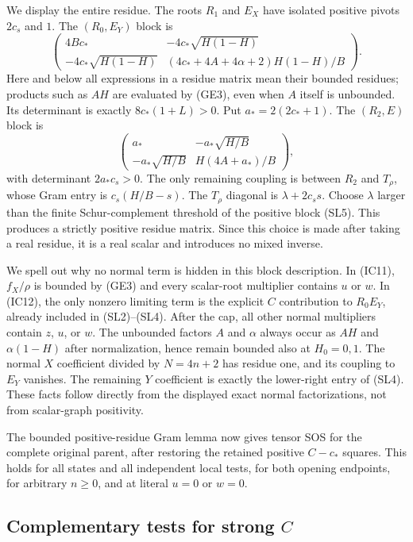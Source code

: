 We display the entire residue. The roots $R_1$ and $E_X$ have isolated
positive pivots $2c_s$ and $1$. The $(R_0,E_Y)$ block is
\[
 \begin{pmatrix}
 4Bc_*&-4c_*\sqrt{H(1-H)}\\
 -4c_*\sqrt{H(1-H)}&
 (4c_*+4A+4\alpha+2)H(1-H)/B
 \end{pmatrix}.
\tag{SL4}
\]
Here and below all expressions in a residue matrix mean their bounded
residues; products such as $AH$ are evaluated by (GE3), even when
$A$ itself is unbounded. Its determinant is exactly $8c_*(1+L)>0$.
Put $a_*=2(2c_*+1)$. The $(R_2,E)$ block is
\[
 \begin{pmatrix}
 a_*&-a_*\sqrt{H/B}\\
 -a_*\sqrt{H/B}&H(4A+a_*)/B
 \end{pmatrix},
\tag{SL5}
\]
with determinant $2a_*c_s>0$. The only remaining coupling is between
$R_2$ and $T_\rho$, whose Gram entry is
$c_s(H/B-s)$. The $T_\rho$ diagonal is $\lambda+2c_s s$.
Choose $\lambda$ larger than the finite Schur-complement threshold
of the positive block (SL5). This produces a strictly positive
residue matrix. Since this choice is made after taking a real
residue, it is a real scalar and introduces no mixed inverse.

We spell out why no normal term is hidden in this block description.
In (IC11), $f_X/\rho$ is bounded by (GE3) and every scalar-root
multiplier contains $u$ or $w$. In (IC12), the only nonzero limiting
term is the explicit $C$ contribution to $R_0E_Y$, already included
in (SL2)--(SL4). After the cap, all other normal multipliers contain
$z$, $u$, or $w$. The unbounded factors $A$ and $\alpha$ always occur
as $AH$ and $\alpha(1-H)$ after normalization, hence remain bounded
also at $H_0=0,1$. The normal $X$ coefficient divided by $N=4n+2$
has residue one, and its coupling to $E_Y$ vanishes. The remaining
$Y$ coefficient is exactly the lower-right entry of (SL4).
These facts follow directly from the displayed exact normal
factorizations, not from scalar-graph positivity.

The bounded positive-residue Gram lemma now gives tensor SOS for the
complete original parent, after restoring the retained positive
$C-c_*$ squares. This holds for all states and all independent local
tests, for both opening endpoints, for arbitrary $n\ge0$, and at
literal $u=0$ or $w=0$.

\subsection{Complementary tests for strong $C$}
\label{component:p7405dbf89341}

